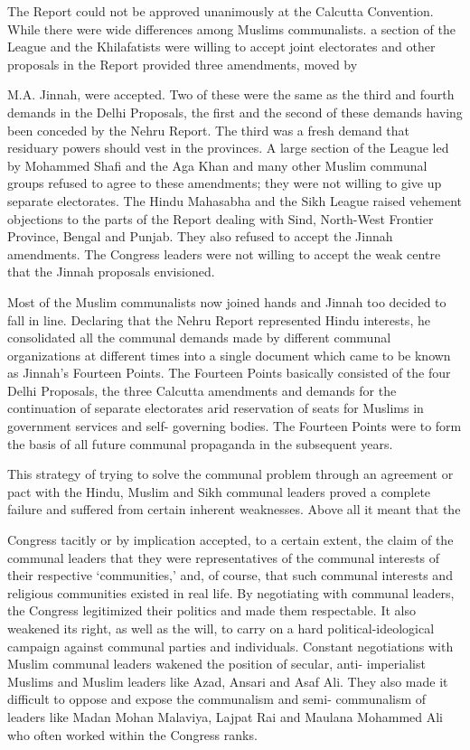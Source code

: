 \begin{multicols}{2}
The Report could not be approved unanimously at the Calcutta Convention. While there were wide differences among Muslims communalists. a section of the League and the Khilafatists were willing to accept joint electorates and other proposals in the Report provided three amendments, moved by 

M.A. Jinnah, were accepted. Two of these were the same as the third and fourth demands in the Delhi Proposals, the first and the second of these demands having been conceded by the Nehru Report. The third was a fresh demand that residuary powers should vest in the provinces. A large section of the League led by Mohammed Shafi and the Aga Khan and many other Muslim communal groups refused to agree to these amendments; they were not willing to give up separate electorates. The Hindu Mahasabha and the Sikh League raised vehement objections to the parts of the Report dealing with Sind, North-West Frontier Province, Bengal and Punjab. They also refused to accept the Jinnah amendments. The Congress leaders were not willing to accept the weak centre that the Jinnah proposals envisioned. 

Most of the Muslim communalists now joined hands and Jinnah too decided to fall in line. Declaring that the Nehru Report represented Hindu interests, he consolidated all the communal demands made by different communal organizations at different times into a single document which came to be known as Jinnah's Fourteen Points. The Fourteen Points basically consisted of the four Delhi Proposals, the three Calcutta amendments and demands for the continuation of separate electorates arid reservation of seats for Muslims in government services and self- governing bodies. The Fourteen Points were to form the basis of all future communal propaganda in the subsequent years. 

This strategy of trying to solve the communal problem through an agreement or pact with the Hindu, Muslim and Sikh communal leaders proved a complete failure and suffered from certain inherent weaknesses. Above all it meant that the 

Congress tacitly or by implication accepted, to a certain extent, the claim of the communal leaders that they were representatives of the communal interests of their respective `communities,' and, of course, that such communal interests and religious communities existed in real life. By negotiating with communal leaders, the Congress legitimized their politics and made them respectable. It also weakened its right, as well as the will, to carry on a hard political-ideological campaign against communal parties and individuals. Constant negotiations with Muslim communal leaders wakened the position of secular, anti- imperialist Muslims and Muslim leaders like Azad, Ansari and Asaf Ali. They also made it difficult to oppose and expose the communalism and semi- communalism of leaders like Madan Mohan Malaviya, Lajpat Rai and Maulana Mohammed Ali who often worked within the Congress ranks. 


\end{multicols}

